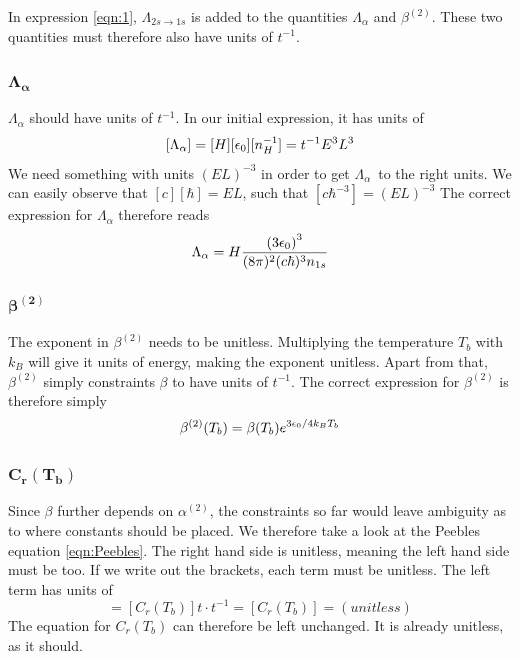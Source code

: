 \documentclass[10pt, a4paper]{article}
\begin{document}
In expression \ref{eqn:1}, $\Lambda_{2s\rightarrow1s}$ is added to the quantities $\Lambda_\alpha$ and $\beta^{(2)}$. These two quantities must therefore also have units of $t^{-1}$.

\subsubsection{\texorpdfstring{$\mathbf{\Lambda_\alpha}$}{TEXT} }
$\Lambda_\alpha$ should have units of $t^{-1}$. In our initial expression, it has units of
\begin{equation*}
    \qty[\Lambda_\alpha] = [H][\epsilon_0][n_H^{-1}] = t^{-1}E^3L^3
\end{equation*}
We need something with units $(EL)^{-3}$ in order to get $\Lambda_\alpha$ to the right units. We can easily observe that $[c][\hbar] = EL$, such that $[c\hbar^{-3}] = (EL)^{-3}$ The correct expression for $\Lambda_\alpha$ therefore reads
\begin{equation*}
    \Lambda_{\alpha} =H \frac{\qty(3 \epsilon_{0})^{3}}{(8 \pi)^{2} (c\hbar)^3 n_{1 s}}
\end{equation*}

\subsubsection{\texorpdfstring{$\mathbf{\beta^{(2)}}$}{TEXT} }
The exponent in $\beta^{(2)}$ needs to be unitless. Multiplying the temperature $T_b$ with $k_B$ will give it units of energy, making the exponent unitless. Apart from that, $\beta^{(2)}$ simply constraints $\beta$ to have units of $t^{-1}$. The correct expression for $\beta^{(2)}$ is therefore simply
\begin{equation*}
    \beta^{(2)}\qty(T_{b}) =\beta\qty(T_{b}) e^{3 \epsilon_{0} / 4 k_B T_{b}}
\end{equation*}

\subsubsection{\texorpdfstring{$\mathbf{C_r(T_b)}$}{TEXT} }
Since $\beta$ further depends on $\alpha^{(2)}$, the constraints so far would leave ambiguity as to where constants should be placed. We therefore take a look at the Peebles equation \ref{eqn:Peebles}. The right hand side is unitless, meaning the left hand side must be too. If we write out the brackets, each term must be unitless. The left term has units of
\begin{equation*}
    [C_r(T_b)][H^{-1}][\beta] = [C_r(T_b)]t\cdot t^{-1} = [C_r(T_b)] = (unitless)
\end{equation*}
The equation for $C_r(T_b)$ can therefore be left unchanged. It is already unitless, as it should.
\end{document}
